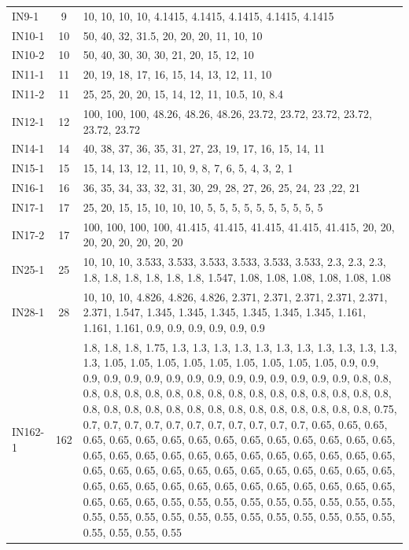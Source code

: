 \documentclass[12pt,a4paper,oneside]{book}
\begin{document}
\begin{tabularx}{\textwidth}{ l c X }
IN9-1 & 9 & 10, 10, 10, 10, 4.1415, 4.1415, 4.1415, 4.1415, 4.1415 \\
IN10-1 & 10 & 50, 40, 32, 31.5, 20, 20, 20, 11, 10, 10 \\
IN10-2 & 10 & 50, 40, 30, 30, 30, 21, 20, 15, 12, 10 \\
IN11-1 & 11 & 20, 19, 18, 17, 16, 15, 14, 13, 12, 11, 10 \\
IN11-2 & 11 & 25, 25, 20, 20, 15, 14, 12, 11, 10.5, 10, 8.4 \\
IN12-1 & 12 & 100, 100, 100, 48.26, 48.26, 48.26, 23.72, 23.72, 23.72, 23.72, 23.72, 23.72 \\
IN14-1 & 14 & 40, 38, 37, 36, 35, 31, 27, 23, 19, 17, 16, 15, 14, 11 \\
IN15-1 & 15 & 15, 14, 13, 12, 11, 10, 9, 8, 7, 6, 5, 4, 3, 2, 1 \\
IN16-1 & 16 & 36, 35, 34, 33, 32, 31, 30, 29, 28, 27, 26, 25, 24, 23 ,22, 21 \\
IN17-1 & 17 & 25, 20, 15, 15, 10, 10, 10, 5, 5, 5, 5, 5, 5, 5, 5, 5, 5 \\
IN17-2 & 17 & 100, 100, 100, 100, 41.415, 41.415, 41.415, 41.415, 41.415, 20, 20, 20, 20, 20, 20, 20, 20 \\
IN25-1 & 25 & 10, 10, 10, 3.533, 3.533, 3.533, 3.533, 3.533, 3.533, 2.3, 2.3, 2.3, 1.8, 1.8, 1.8, 1.8, 1.8, 1.8, 1.547, 1.08, 1.08, 1.08, 1.08, 1.08, 1.08 \\
IN28-1 & 28 & 10, 10, 10, 4.826, 4.826, 4.826, 2.371, 2.371, 2.371, 2.371, 2.371, 2.371, 1.547, 1.345, 1.345, 1.345, 1.345, 1.345, 1.345, 1.161, 1.161, 1.161, 0.9, 0.9, 0.9, 0.9, 0.9, 0.9  \\
IN162-1 & 162 & 1.8, 1.8, 1.8, 1.75, 1.3, 1.3, 1.3, 1.3, 1.3, 1.3, 1.3, 1.3, 1.3, 1.3, 1.3, 1.3, 1.05, 1.05, 1.05, 1.05, 1.05, 1.05, 1.05, 1.05, 1.05, 0.9, 0.9, 0.9, 0.9, 0.9, 0.9, 0.9, 0.9, 0.9, 0.9, 0.9, 0.9, 0.9, 0.9, 0.9, 0.8, 0.8, 0.8, 0.8, 0.8, 0.8, 0.8, 0.8, 0.8, 0.8, 0.8, 0.8, 0.8, 0.8, 0.8, 0.8, 0.8, 0.8, 0.8, 0.8, 0.8, 0.8, 0.8, 0.8, 0.8, 0.8, 0.8, 0.8, 0.8, 0.8, 0.8, 0.75, 0.7, 0.7, 0.7, 0.7, 0.7, 0.7, 0.7, 0.7, 0.7, 0.7, 0.7, 0.65, 0.65, 0.65, 0.65, 0.65, 0.65, 0.65, 0.65, 0.65, 0.65, 0.65, 0.65, 0.65, 0.65, 0.65, 0.65, 0.65, 0.65, 0.65, 0.65, 0.65, 0.65, 0.65, 0.65, 0.65, 0.65, 0.65, 0.65, 0.65, 0.65, 0.65, 0.65, 0.65, 0.65, 0.65, 0.65, 0.65, 0.65, 0.65, 0.65, 0.65, 0.65, 0.65, 0.65, 0.65, 0.65, 0.65, 0.65, 0.65, 0.65, 0.65, 0.65, 0.65, 0.65, 0.55, 0.55, 0.55, 0.55, 0.55, 0.55, 0.55, 0.55, 0.55, 0.55, 0.55, 0.55, 0.55, 0.55, 0.55, 0.55, 0.55, 0.55, 0.55, 0.55, 0.55, 0.55, 0.55, 0.55, 0.55 \\
\bottomrule
\end{tabularx}
\end{document}

